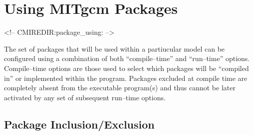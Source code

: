 
\section{Using MITgcm Packages}
\label{sec:pkg:using}
\begin{rawhtml}
<!-- CMIREDIR:package_using: -->
\end{rawhtml}

The set of packages that will be used within a partiucular model can
be configured using a combination of both ``compile--time'' and
``run--time'' options.  Compile--time options are those used to select
which packages will be ``compiled in'' or implemented within the
program.  Packages excluded at compile time are completely absent from
the executable program(s) and thus cannot be later activated by any
set of subsequent run--time options.

\subsection{Package Inclusion/Exclusion}

